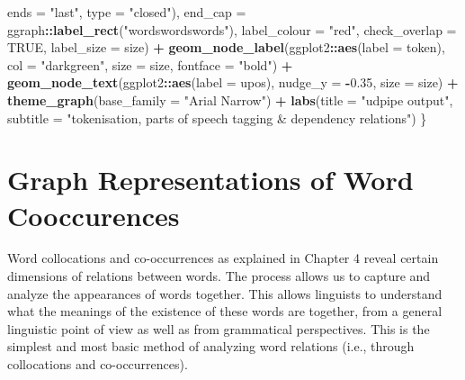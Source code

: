 \documentclass[
]{article}
\newenvironment{Shaded}{\begin{snugshade}}{\end{snugshade}}
\newcommand{\AttributeTok}[1]{\textcolor[rgb]{0.13,0.29,0.53}{#1}}
\newcommand{\ConstantTok}[1]{\textcolor[rgb]{0.56,0.35,0.01}{#1}}
\newcommand{\FloatTok}[1]{\textcolor[rgb]{0.00,0.00,0.81}{#1}}
\newcommand{\FunctionTok}[1]{\textcolor[rgb]{0.13,0.29,0.53}{\textbf{#1}}}
\newcommand{\NormalTok}[1]{#1}
\newcommand{\SpecialCharTok}[1]{\textcolor[rgb]{0.81,0.36,0.00}{\textbf{#1}}}
\newcommand{\StringTok}[1]{\textcolor[rgb]{0.31,0.60,0.02}{#1}}
\begin{document}
\begin{Shaded}
\begin{Highlighting}[]
                            \AttributeTok{ends =} \StringTok{"last"}\NormalTok{,}
                            \AttributeTok{type =} \StringTok{"closed"}\NormalTok{),}
        \AttributeTok{end\_cap =}\NormalTok{ ggraph}\SpecialCharTok{::}\FunctionTok{label\_rect}\NormalTok{(}\StringTok{"wordswordswords"}\NormalTok{),}
        \AttributeTok{label\_colour =} \StringTok{"red"}\NormalTok{, }\AttributeTok{check\_overlap =} \ConstantTok{TRUE}\NormalTok{, }\AttributeTok{label\_size =}\NormalTok{ size) }\SpecialCharTok{+}
      \FunctionTok{geom\_node\_label}\NormalTok{(ggplot2}\SpecialCharTok{::}\FunctionTok{aes}\NormalTok{(}\AttributeTok{label =}\NormalTok{ token), }
                      \AttributeTok{col =} \StringTok{"darkgreen"}\NormalTok{,}
                      \AttributeTok{size =}\NormalTok{ size, }\AttributeTok{fontface =} \StringTok{"bold"}\NormalTok{) }\SpecialCharTok{+}
      \FunctionTok{geom\_node\_text}\NormalTok{(ggplot2}\SpecialCharTok{::}\FunctionTok{aes}\NormalTok{(}\AttributeTok{label =}\NormalTok{ upos), }\AttributeTok{nudge\_y =} \SpecialCharTok{{-}}\FloatTok{0.35}\NormalTok{, }\AttributeTok{size =}\NormalTok{ size) }\SpecialCharTok{+}
      \FunctionTok{theme\_graph}\NormalTok{(}\AttributeTok{base\_family =} \StringTok{"Arial Narrow"}\NormalTok{) }\SpecialCharTok{+}  
      \FunctionTok{labs}\NormalTok{(}\AttributeTok{title =} \StringTok{"udpipe output"}\NormalTok{, }
         \AttributeTok{subtitle =} \StringTok{"tokenisation, parts of speech tagging \& dependency relations"}\NormalTok{)}
\NormalTok{\}}
\end{Highlighting}
\end{Shaded}

\normalsize

\hypertarget{graph-representations-of-word-cooccurrences}{%
\section{Graph Representations of Word Cooccurences}\label{graph-representations-of-word-cooccurrences}}

Word collocations and co-occurrences as explained in Chapter 4 reveal certain dimensions of relations between words. The process allows us to capture and analyze the appearances of words together. This allows linguists to understand what the meanings of the existence of these words are together, from a general linguistic point of view as well as from grammatical perspectives. This is the simplest and most basic method of analyzing word relations (i.e., through collocations and co-occurrences).
\end{document}
